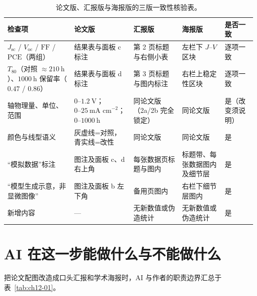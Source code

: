 \begin{table}[htbp]\centering\footnotesize
\setlength{\tabcolsep}{3pt}
\renewcommand{\arraystretch}{1.15}
\caption{论文版、汇报版与海报版的三版一致性核验表。}\label{tab:ch12-02}
\begin{tabularx}{\linewidth}{@{}>{\raggedright\arraybackslash}p{26mm}YYY>{\raggedright\arraybackslash}p{16mm}@{}}
\toprule
\textbf{检查项} & \textbf{论文版} & \textbf{汇报版} & \textbf{海报版} & \textbf{是否一致} \\
\midrule
$J_{\text{sc}}$ / $V_{\text{oc}}$ / $\text{FF}$ / $\text{PCE}$（两组） & 结果表与面板 c 标注 & 第 2 页标题与右侧小表 & 左栏下 $J\text{--}V$ 区块 & 逐项一致 \\
$T_{80}$（对照 $\approx 210\ \text{h}$）、$1000\ \text{h}$ 保留率（$0.47$ / $0.86$） & 结果表与面板 d 标注 & 第 3 页标题与图内标注 & 右栏上稳定性区块 & 逐项一致 \\
轴物理量、单位、范围 & $0\text{--}1.2\ \text{V}$；$0\text{--}25\ \text{mA cm}^{-2}$；$0\text{--}1000\ \text{h}$ & 同论文版（2a/2b 完全锁定） & 同论文版 & 是（改变须说明） \\
颜色与线型语义 & 灰虚线=对照，青实线=改性 & 同论文版 & 同论文版 & 是 \\
“模拟数据”标注 & 图注及面板 c、d 右上角 & 每张数据页标题与图内 & 标题带、每张数据图内及细节层 & 是 \\
“模型生成示意，非显微图像” & 图注及面板 b 左下角 & 备用页图内 & 右栏下细节层图内 & 是 \\
新增内容 & — & 无新数值或伪造统计 & 无新数值或伪造统计 & 是 \\
\bottomrule
\end{tabularx}
\end{table}

\section{AI 在这一步能做什么与不能做什么}

把论文配图改造成口头汇报和学术海报时，AI 与作者的职责边界汇总于表~\ref{tab:ch12-01}。

